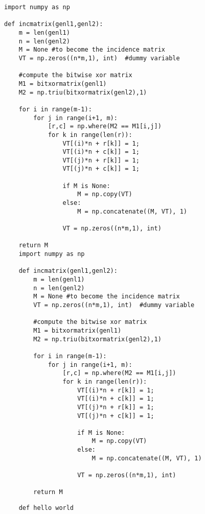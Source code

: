 \documentclass{article}
\begin{document}
\begin{lstlisting}
import numpy as np

def incmatrix(genl1,genl2):
    m = len(genl1)
    n = len(genl2)
    M = None #to become the incidence matrix
    VT = np.zeros((n*m,1), int)  #dummy variable

    #compute the bitwise xor matrix
    M1 = bitxormatrix(genl1)
    M2 = np.triu(bitxormatrix(genl2),1)

    for i in range(m-1):
        for j in range(i+1, m):
            [r,c] = np.where(M2 == M1[i,j])
            for k in range(len(r)):
                VT[(i)*n + r[k]] = 1;
                VT[(i)*n + c[k]] = 1;
                VT[(j)*n + r[k]] = 1;
                VT[(j)*n + c[k]] = 1;

                if M is None:
                    M = np.copy(VT)
                else:
                    M = np.concatenate((M, VT), 1)

                VT = np.zeros((n*m,1), int)

    return M
    import numpy as np

    def incmatrix(genl1,genl2):
        m = len(genl1)
        n = len(genl2)
        M = None #to become the incidence matrix
        VT = np.zeros((n*m,1), int)  #dummy variable

        #compute the bitwise xor matrix
        M1 = bitxormatrix(genl1)
        M2 = np.triu(bitxormatrix(genl2),1)

        for i in range(m-1):
            for j in range(i+1, m):
                [r,c] = np.where(M2 == M1[i,j])
                for k in range(len(r)):
                    VT[(i)*n + r[k]] = 1;
                    VT[(i)*n + c[k]] = 1;
                    VT[(j)*n + r[k]] = 1;
                    VT[(j)*n + c[k]] = 1;

                    if M is None:
                        M = np.copy(VT)
                    else:
                        M = np.concatenate((M, VT), 1)

                    VT = np.zeros((n*m,1), int)

        return M
\end{lstlisting}


\begin{lstlisting}
	def hello world
\end{lstlisting}

\cleardoublepage



\renewcommand{\contentsname}{Inhaltsverzeichnis}
\tableofcontents
\thispagestyle{empty}%
\cleardoublepage
\end{document}
